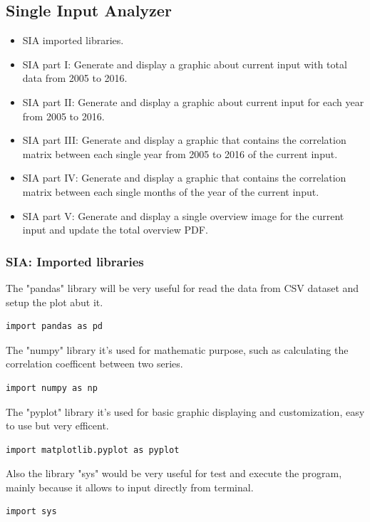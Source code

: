 \subsection{Single Input Analyzer}
\begin{itemize}
\item SIA imported libraries.
\item SIA part I: Generate and display a graphic about current input with total data from 2005 to 2016.
\item SIA part II: Generate and display a graphic about current input for each year from 2005 to 2016.
\item SIA part III: Generate and display a graphic that contains the correlation matrix between each single year from 2005 to 2016 of the current input.
\item SIA part IV: Generate and display a graphic that contains the correlation matrix between each single months of the year of the current input.
\item SIA part V: Generate and display a single overview image for the current input and update the total overview PDF.
\end{itemize}

\newpage
\subsubsection{SIA: Imported libraries}
The "pandas" library will be very useful for read the data from CSV dataset and setup the plot abut it.
\begin{lstlisting}
import pandas as pd
\end{lstlisting}

The "numpy" library it's used for mathematic purpose, such as calculating the correlation coefficent between two series.
\begin{lstlisting}
import numpy as np
\end{lstlisting}
 
The "pyplot" library it's used for basic graphic displaying and customization, easy to use but very efficent.
\begin{lstlisting}
import matplotlib.pyplot as pyplot
\end{lstlisting}

Also the library "sys" would be very useful for test and execute the program, mainly because it allows to input directly from terminal.
\begin{lstlisting}
import sys
\end{lstlisting}


